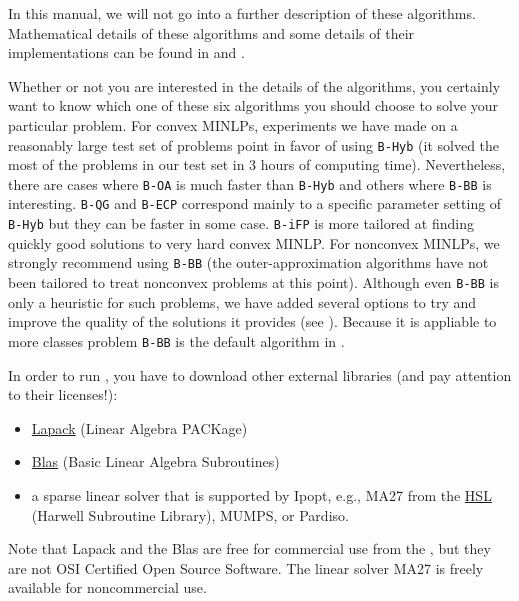 In this manual,  we will not go into a further description of these algorithms.
Mathematical details of these algorithms 
and some details of their implementations can be found in  and .

Whether or not you are interested in the details of the algorithms, you certainly
want to know which one of these six algorithms you should choose to solve
your particular problem.
For convex MINLPs, experiments we have made on a reasonably large test set of problems point in favor of using {\tt B-Hyb}
(it solved the most of the problems in our test set in 3 hours of computing time).
Nevertheless, there are cases where {\tt B-OA} is much faster than {\tt B-Hyb} and others where {\tt B-BB} is interesting.
{\tt B-QG} and {\tt B-ECP} correspond mainly to a specific parameter setting of {\tt B-Hyb} but they can be faster in some case. {\tt B-iFP} is more tailored at finding quickly good solutions to very hard convex MINLP.
For nonconvex MINLPs, we strongly recommend using {\tt B-BB} (the outer-approximation algorithms
have not been tailored to treat nonconvex problems at this point). Although even {\tt B-BB} is only a
heuristic for such problems, we have added several
options to try and improve the quality of the solutions it provides (see ).
Because it is appliable to more classes problem {\tt B-BB} is the default algorithm in \Bonmin.

In order to run {\Bonmin}, you have to download other external
libraries (and pay attention to their licenses!):
\begin{itemize}
\item \href{\LapackAddr}{Lapack} (Linear Algebra
PACKage)
\item \href{\BlasAddr}{Blas} (Basic Linear Algebra
Subroutines)
\item a sparse linear solver that is supported by Ipopt, e.g., MA27 from the
\href{\AslAddr}{HSL}
(Harwell Subroutine Library), MUMPS, or Pardiso.
\end{itemize}

Note that Lapack and the Blas are free for commercial use from the
, but they are
not OSI Certified Open Source Software. The linear solver MA27 is
freely available for noncommercial use.

